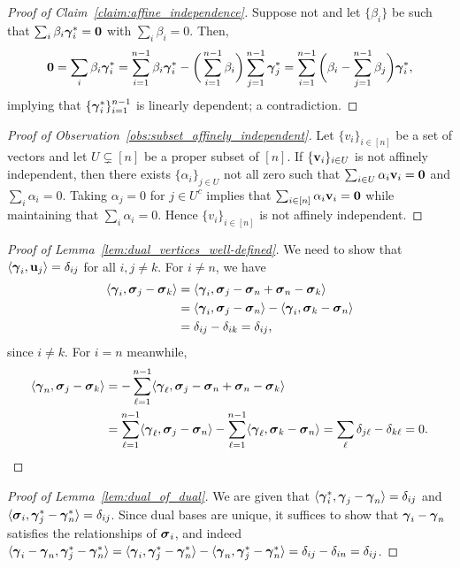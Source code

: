 \begin{proof}[Proof of Claim~\ref{claim:affine_independence}]
	Suppose not and let $\{\beta_i\}$ be such that $\sum_i \beta_i \vb*{\gamma}^*_i =\vb{0}$ with $\sum_i\beta_i=0$. Then, 
	\[\vb{0} = \sum_i\beta_i\vb*{\gamma}^*_i = \sum_{i=1}^{n-1} \beta_i \vb*{\gamma}^*_i - \bigg(\sum_{i=1}^{n-1} \beta_i\bigg)\sum_{j=1}^{n-1}\vb*{\gamma}^*_j = \sum_{i=1}^{n-1}\bigg(\beta_i-\sum_{j=1}^{n-1}\beta_j\bigg)\vb*{\gamma}^*_i,\]
	implying that $\{\vb*{\gamma}^*_i\}_{i=1}^{n-1}$ is linearly dependent; a contradiction.  
\end{proof}

\begin{proof}[Proof of Observation~\ref{obs:subset_affinely_independent}]
	Let $\{v_i\}_{i\in[n]}$ be a set of vectors and let $U\subsetneq[n]$ be a proper subset of $[n]$. If $\{\vb{v}_i\}_{i\in U}$ is not affinely independent, then there exists $\{\alpha_i\}_{j\in U}$ not all zero such that $\sum_{i\in U}\alpha_i\vb{v}_i=\vb{0}$ and $\sum_i\alpha_i=0$. Taking $\alpha_j=0$ for $j\in U^c$ implies that $\sum_{i\in[n]}\alpha_i\vb{v}_i=\vb{0}$ while maintaining that $\sum_{i}\alpha_i=0$. Hence $\{v_i\}_{i\in[n]}$ is not affinely independent. 
\end{proof}

\begin{proof}[Proof of Lemma~\ref{lem:dual_vertices_well-defined}]
	We need to show that $\langle \vb*{\gamma}_i,\vb{u}_j\rangle = \delta_{ij}$ for all $i,j\neq k$. For $i\neq n$, we have 
	\begin{align*}
	\langle \vb*{\gamma}_i, \vb*{\sigma}_j-\vb*{\sigma}_k\rangle &= \langle \vb*{\gamma}_i,\vb*{\sigma}_j-\vb*{\sigma}_n+\vb*{\sigma}_n-\vb*{\sigma}_k\rangle \\
	&= \langle \vb*{\gamma}_i,\vb*{\sigma}_j-\vb*{\sigma}_n \rangle - \langle \vb*{\gamma}_i,\vb*{\sigma}_k-\vb*{\sigma}_n\rangle \\
	&= \delta_{ij} - \delta_{ik} = \delta_{ij},
	\end{align*}
	since $i\neq k$. For $i=n$ meanwhile, 
	\begin{align*}
	\langle \vb*{\gamma}_n,\vb*{\sigma}_j-\vb*{\sigma}_k\rangle &= -\sum_{\ell=1}^{n-1}\langle \vb*{\gamma}_\ell,\vb*{\sigma}_j-\vb*{\sigma}_n+\vb*{\sigma}_n-\vb*{\sigma}_k\rangle \\
	&= \sum_{\ell=1}^{n-1}\langle \vb*{\gamma}_\ell,\vb*{\sigma}_j-\vb*{\sigma}_n\rangle - \sum_{\ell=1}^{n-1}\langle  \vb*{\gamma}_\ell,\vb*{\sigma}_k-\vb*{\sigma}_n\rangle =\sum_{\ell}\delta_{j\ell}-\delta_{k\ell}=0. \qedhere
	\end{align*}
\end{proof}


\begin{proof}[Proof of Lemma~\ref{lem:dual_of_dual}]
	We are given that $\langle \vb*{\gamma}_i^*,\vb*{\gamma}_j-\vb*{\gamma}_n\rangle=\delta_{ij}$ and $\langle \vb*{\sigma}_i,\vb*{\gamma}_j^*-\vb*{\gamma}_n^*\rangle=\delta_{ij}$. Since dual bases are unique, it suffices to show that $\vb*{\gamma}_i-\vb*{\gamma}_n$ satisfies the relationships of $\vb*{\sigma}_i$, and indeed $\langle \vb*{\gamma}_i-\vb*{\gamma}_n,\vb*{\gamma}_j^*-\vb*{\gamma}_n^*\rangle = \langle \vb*{\gamma}_i,\vb*{\gamma}_j^*-\vb*{\gamma}_n^*\rangle - \langle \vb*{\gamma}_n,\vb*{\gamma}_j^*-\vb*{\gamma}_n^*\rangle = \delta_{ij} - \delta_{in} = \delta_{ij}$. 
\end{proof} 

